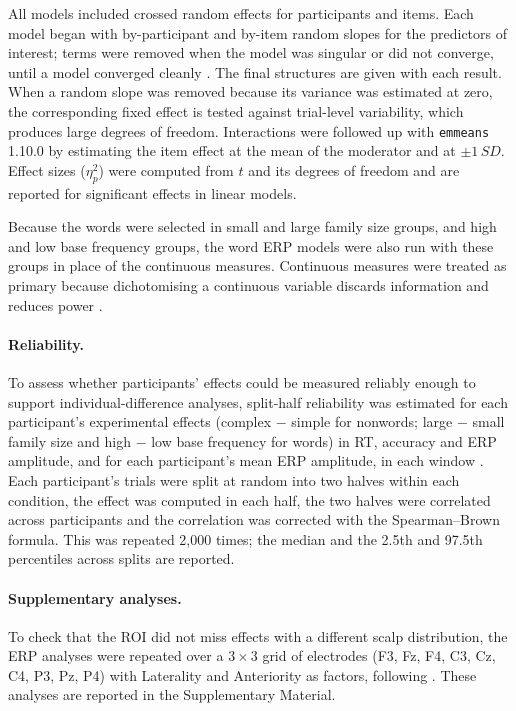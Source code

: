 All models included crossed random effects for participants and items. Each model
began with by-participant and by-item random slopes for the predictors of
interest; terms were removed when the model was singular or did not converge,
until a model converged cleanly \citep{batesParsimoniousMixedModels2018a}.
The final structures are given with each result. When a random slope was removed
because its variance was estimated at zero, the corresponding fixed effect is
tested against trial-level variability, which produces large degrees of freedom.
Interactions were followed up with \texttt{emmeans} 1.10.0
\citep{lenthEmmeansEstimatedMarginal2024}
by estimating the item effect at the mean of the moderator and at $\pm 1\,SD$.
Effect sizes ($\eta^2_p$) were computed from $t$ and its degrees of freedom and
are reported for significant effects in linear models.

Because the words were selected in small and large family size groups, and high
and low base frequency groups, the word ERP models were also run with these
groups in place of the continuous measures. Continuous measures were treated as
primary because dichotomising a continuous variable discards information and
reduces power \citep{maccallumPracticeDichotomizationQuantitative2002}.

\paragraph{Reliability.}
To assess whether participants' effects could be measured reliably enough to
support individual-difference analyses, split-half reliability was estimated
for each participant's experimental effects (complex $-$ simple for nonwords;
large $-$ small family size and high $-$ low base frequency for words) in RT,
accuracy and ERP amplitude, and for each participant's mean ERP amplitude, in
each window \citep{parsonsPsychologicalScienceNeeds2019}.
Each participant's trials were split at random into two halves within each
condition, the effect was computed in each half, the two halves were correlated
across participants and the correlation was corrected with the Spearman--Brown
formula. This was repeated 2,000 times; the median and the 2.5th and 97.5th
percentiles across splits are reported.

\paragraph{Supplementary analyses.}
To check that the ROI did not miss effects with a different scalp distribution,
the ERP analyses were repeated over a $3 \times 3$ grid of electrodes (F3, Fz,
F4, C3, Cz, C4, P3, Pz, P4) with Laterality and Anteriority as factors,
following \citet{yumERPStudyInitial2014}.
These analyses are reported in the Supplementary Material.

